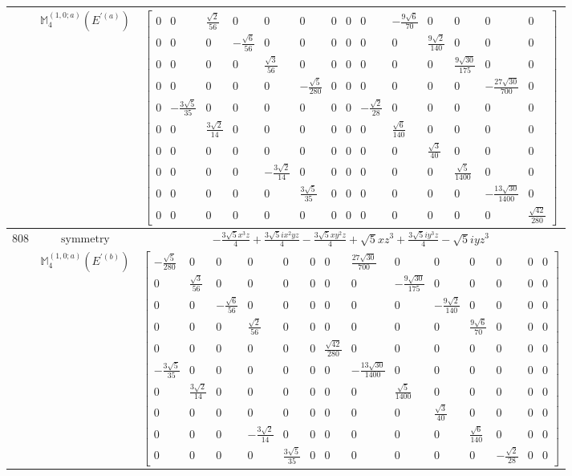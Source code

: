 \documentclass[fleqn,8pt,landscape]{jsarticle}
\begin{document}
\begin{longtable}{ccc}
$  $ & $ \mathbb{M}_{4}^{(1,0;a)}(E^{\prime(a)}) $ & $ \begin{bmatrix} 0 & 0 & \frac{\sqrt{2}}{56} & 0 & 0 & 0 & 0 & 0 & 0 & - \frac{9 \sqrt{6}}{70} & 0 & 0 & 0 & 0 \\ 0 & 0 & 0 & - \frac{\sqrt{6}}{56} & 0 & 0 & 0 & 0 & 0 & 0 & \frac{9 \sqrt{2}}{140} & 0 & 0 & 0 \\ 0 & 0 & 0 & 0 & \frac{\sqrt{3}}{56} & 0 & 0 & 0 & 0 & 0 & 0 & \frac{9 \sqrt{30}}{175} & 0 & 0 \\ 0 & 0 & 0 & 0 & 0 & - \frac{\sqrt{5}}{280} & 0 & 0 & 0 & 0 & 0 & 0 & - \frac{27 \sqrt{30}}{700} & 0 \\ 0 & - \frac{3 \sqrt{5}}{35} & 0 & 0 & 0 & 0 & 0 & 0 & - \frac{\sqrt{2}}{28} & 0 & 0 & 0 & 0 & 0 \\ 0 & 0 & \frac{3 \sqrt{2}}{14} & 0 & 0 & 0 & 0 & 0 & 0 & \frac{\sqrt{6}}{140} & 0 & 0 & 0 & 0 \\ 0 & 0 & 0 & 0 & 0 & 0 & 0 & 0 & 0 & 0 & \frac{\sqrt{3}}{40} & 0 & 0 & 0 \\ 0 & 0 & 0 & 0 & - \frac{3 \sqrt{2}}{14} & 0 & 0 & 0 & 0 & 0 & 0 & \frac{\sqrt{5}}{1400} & 0 & 0 \\ 0 & 0 & 0 & 0 & 0 & \frac{3 \sqrt{5}}{35} & 0 & 0 & 0 & 0 & 0 & 0 & - \frac{13 \sqrt{30}}{1400} & 0 \\ 0 & 0 & 0 & 0 & 0 & 0 & 0 & 0 & 0 & 0 & 0 & 0 & 0 & \frac{\sqrt{42}}{280} \end{bmatrix} $ \\ \hline
$ 808 $ & $ \text{symmetry} $ & $ - \frac{3 \sqrt{5} x^{3} z}{4} + \frac{3 \sqrt{5} i x^{2} y z}{4} - \frac{3 \sqrt{5} x y^{2} z}{4} + \sqrt{5} x z^{3} + \frac{3 \sqrt{5} i y^{3} z}{4} - \sqrt{5} i y z^{3} $ \\
$  $ & $ \mathbb{M}_{4}^{(1,0;a)}(E^{\prime(b)}) $ & $ \begin{bmatrix} - \frac{\sqrt{5}}{280} & 0 & 0 & 0 & 0 & 0 & 0 & \frac{27 \sqrt{30}}{700} & 0 & 0 & 0 & 0 & 0 & 0 \\ 0 & \frac{\sqrt{3}}{56} & 0 & 0 & 0 & 0 & 0 & 0 & - \frac{9 \sqrt{30}}{175} & 0 & 0 & 0 & 0 & 0 \\ 0 & 0 & - \frac{\sqrt{6}}{56} & 0 & 0 & 0 & 0 & 0 & 0 & - \frac{9 \sqrt{2}}{140} & 0 & 0 & 0 & 0 \\ 0 & 0 & 0 & \frac{\sqrt{2}}{56} & 0 & 0 & 0 & 0 & 0 & 0 & \frac{9 \sqrt{6}}{70} & 0 & 0 & 0 \\ 0 & 0 & 0 & 0 & 0 & 0 & \frac{\sqrt{42}}{280} & 0 & 0 & 0 & 0 & 0 & 0 & 0 \\ - \frac{3 \sqrt{5}}{35} & 0 & 0 & 0 & 0 & 0 & 0 & - \frac{13 \sqrt{30}}{1400} & 0 & 0 & 0 & 0 & 0 & 0 \\ 0 & \frac{3 \sqrt{2}}{14} & 0 & 0 & 0 & 0 & 0 & 0 & \frac{\sqrt{5}}{1400} & 0 & 0 & 0 & 0 & 0 \\ 0 & 0 & 0 & 0 & 0 & 0 & 0 & 0 & 0 & \frac{\sqrt{3}}{40} & 0 & 0 & 0 & 0 \\ 0 & 0 & 0 & - \frac{3 \sqrt{2}}{14} & 0 & 0 & 0 & 0 & 0 & 0 & \frac{\sqrt{6}}{140} & 0 & 0 & 0 \\ 0 & 0 & 0 & 0 & \frac{3 \sqrt{5}}{35} & 0 & 0 & 0 & 0 & 0 & 0 & - \frac{\sqrt{2}}{28} & 0 & 0 \end{bmatrix} $ \\ \hline

\end{longtable}
\end{document}
